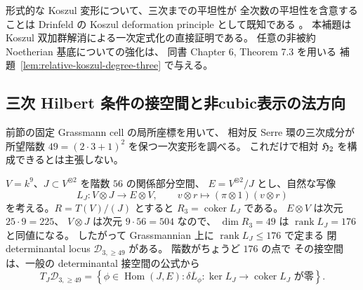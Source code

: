 \begin{remark}
形式的な Koszul 変形について、三次までの平坦性が
全次数の平坦性を含意することは Drinfeld の
Koszul deformation principle として既知である
\cite[Chapter 6, Theorem 2.1 と同章導入]{PolishchukPositselski2005}。
本補題は Koszul 双加群解消による一次定式化の直接証明である。
任意の非被約 Noetherian 基底についての強化は、
同書 Chapter 6, Theorem 7.3 を用いる
補題~\ref{lem:relative-koszul-degree-three} で与える。
\end{remark}

\subsection{三次 Hilbert 条件の接空間と非cubic表示の法方向}
\label{subsec:noncubic-tangent-degree-three}

前節の固定 Grassmann cell の局所座標を用いて、
相対反 Serre 環の三次成分が所望階数
$49=(2\cdot3+1)^2$ を保つ一次変形を調べる。
これだけで相対 $\mathfrak H_2$ を構成できるとは主張しない。

$V=k^9$、$J\subset V^{\otimes2}$ を階数 $56$ の関係部分空間、
$E=V^{\otimes2}/J$ とし、自然な写像
\[
 L_J:V\otimes J\longrightarrow E\otimes V,\qquad
 v\otimes r\longmapsto(\pi\otimes1)(v\otimes r)
 \tag{H3-L}\label{eq:noncubic-degree-three-relation-map}
\]
を考える。$R=T(V)/(J)$ とすると
$R_3=\operatorname{coker}L_J$ である。
$E\otimes V$ は次元 $25\cdot9=225$、
$V\otimes J$ は次元 $9\cdot56=504$ なので、
$\dim R_3=49$ は $\operatorname{rank}L_J=176$ と同値になる。
したがって Grassmannian 上に
$\operatorname{rank}L_J\le176$ で定まる
閉 determinantal locus $\mathcal D_{3,\ge49}$ がある。
階数がちょうど $176$ の点で
その接空間は、一般の determinantal 接空間の公式から
\[
 T_J\mathcal D_{3,\ge49}
 =\left\{
 \phi\in\operatorname{Hom}(J,E):
 \overline{\delta L_\phi}:
   \ker L_J\to\operatorname{coker}L_J
 \text{ が零}
 \right\}.
 \tag{H3-T}\label{eq:noncubic-third-degree-tangent}
\]

